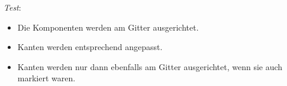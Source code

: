 
\emph{Test}:
\begin{itemize}
\item Die Komponenten werden am Gitter ausgerichtet.
\item Kanten werden entsprechend angepasst.
\item Kanten werden nur dann ebenfalls am Gitter ausgerichtet, wenn sie auch
  markiert waren.
\end{itemize}
